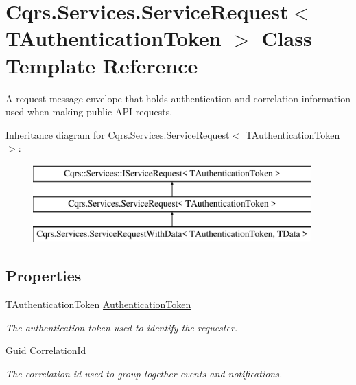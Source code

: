 \hypertarget{classCqrs_1_1Services_1_1ServiceRequest}{}\section{Cqrs.\+Services.\+Service\+Request$<$ T\+Authentication\+Token $>$ Class Template Reference}
\label{classCqrs_1_1Services_1_1ServiceRequest}


A request message envelope that holds authentication and correlation information used when making public A\+PI requests.  


Inheritance diagram for Cqrs.\+Services.\+Service\+Request$<$ T\+Authentication\+Token $>$\+:\begin{figure}[H]
\begin{center}
\leavevmode
\includegraphics[height=3.000000cm]{classCqrs_1_1Services_1_1ServiceRequest}
\end{center}
\end{figure}
\subsection*{Properties}
\begin{DoxyCompactItemize}
\item 
T\+Authentication\+Token \hyperlink{classCqrs_1_1Services_1_1ServiceRequest_ac1a9faff43be83d010b5b59a849c4c4b_ac1a9faff43be83d010b5b59a849c4c4b}{Authentication\+Token}
\begin{DoxyCompactList}\small\item\em The authentication token used to identify the requester. \end{DoxyCompactList}\item 
Guid \hyperlink{classCqrs_1_1Services_1_1ServiceRequest_abbf7a905744ac65ab59edf4f550cad61_abbf7a905744ac65ab59edf4f550cad61}{Correlation\+Id}
\begin{DoxyCompactList}\small\item\em The correlation id used to group together events and notifications. \end{DoxyCompactList}\end{DoxyCompactItemize}


